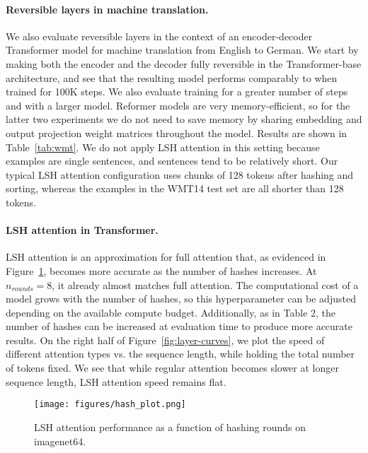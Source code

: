 \paragraph{Reversible layers in machine translation.}
We also evaluate reversible layers in the context of an encoder-decoder Transformer model for machine translation from English to German. We start by making both the encoder and the decoder fully reversible in the Transformer-base architecture, and see that the resulting model performs comparably to \citet{transformer} when trained for 100K steps. We also evaluate training for a greater number of steps and with a larger model. Reformer models are very memory-efficient, so for the latter two experiments we do not need to save memory by sharing embedding and output projection weight matrices throughout the model. Results are shown in Table~\ref{tab:wmt}. We do not apply LSH attention in this setting because examples are single sentences, and sentences tend to be relatively short. Our typical LSH attention configuration uses chunks of 128 tokens after hashing and sorting, whereas the examples in the WMT14 test set are all shorter than 128 tokens.

\paragraph{LSH attention in Transformer.} \label{sec:exp_lsh}
LSH attention is an approximation for full attention that, as evidenced in Figure~\ref{fig:hash-curves}, becomes more accurate as the number of hashes increases. At $n_{rounds}=8$, it already almost matches full attention. The computational cost of a model grows with the number of hashes, so this hyperparameter can be adjusted depending on the available compute budget. Additionally, as in Table 2, the number of hashes can be increased at evaluation time to produce more accurate results.
On the right half of Figure~\ref{fig:layer-curves}, we plot the speed of different attention types vs. the sequence length, while holding the total number of tokens fixed. We see that while regular attention becomes slower at longer sequence length, LSH attention speed remains flat.

\begin{figure}[!t]
    \centering
    \texttt{[image: figures/hash\_plot.png]}
    \caption{LSH attention performance as a function of hashing rounds on imagenet64.}
    \label{fig:hash-curves}
\end{figure}

